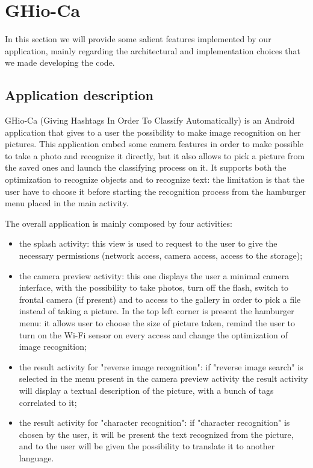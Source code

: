\section{GHio-Ca}
In this section we will provide some salient features implemented by our 
application, mainly regarding the architectural and implementation choices that 
we made developing the code.

\subsection{Application description}
GHio-Ca (Giving Hashtags In Order To Classify Automatically) is an Android 
application that gives to a user the possibility to make image recognition on 
her pictures. This application embed some camera features in order to make 
possible to take a photo and recognize it directly, but it also allows to pick 
a picture from the saved ones and launch the classifying process on it. It 
supports both the optimization to recognize objects and to recognize text: the 
limitation is that the user have to choose it before starting the recognition 
process from the hamburger menu placed in the main activity. 

The overall application is mainly composed by four activities:
\begin{itemize}
	\item the splash activity: this view is used to request to the user to give 
		  the necessary permissions (network access, camera access, access to 
		  the storage);
	\item the camera preview activity: this one displays the user a minimal 
	      camera interface, with the possibility to take photos, turn off the 
	      flash, switch to frontal camera (if present) and to access to the 
	      gallery in order to pick a file instead of taking a picture. In the 
	      top left corner is present the hamburger menu: it allows user to 
	      choose the size of picture taken, remind the user to turn on the Wi-Fi 
	      sensor on every access and change the optimization of image recognition;
	\item the result activity for "reverse image recognition": if "reverse 
	      image search" is selected in the menu present in the camera preview 
	      activity the result activity will display a textual description of the
	      picture, with a bunch of tags correlated to it;
	\item the result activity for "character recognition": if "character 
	      recognition" is chosen by the user, it will be present the text 
	      recognized from the picture, and to the user will be given the 
	      possibility to translate it to another language.
\end{itemize}

